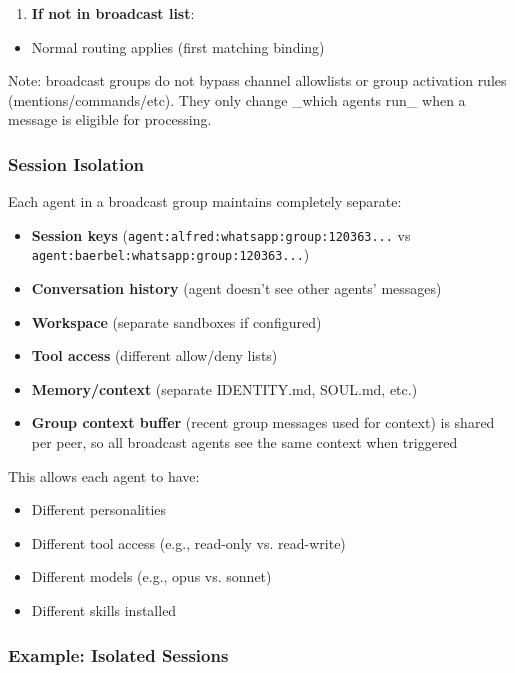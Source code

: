 \begin{enumerate}
  \item \textbf{If not in broadcast list}:
\end{enumerate}

\begin{itemize}
  \item Normal routing applies (first matching binding)
\end{itemize}


Note: broadcast groups do not bypass channel allowlists or group activation rules (mentions/commands/etc). They only change \_which agents run\_ when a message is eligible for processing.

\subsubsection{Session Isolation}


Each agent in a broadcast group maintains completely separate:

\begin{itemize}
  \item \textbf{Session keys} (\texttt{agent:alfred:whatsapp:group:120363...} vs \texttt{agent:baerbel:whatsapp:group:120363...})
  \item \textbf{Conversation history} (agent doesn't see other agents' messages)
  \item \textbf{Workspace} (separate sandboxes if configured)
  \item \textbf{Tool access} (different allow/deny lists)
  \item \textbf{Memory/context} (separate IDENTITY.md, SOUL.md, etc.)
  \item \textbf{Group context buffer} (recent group messages used for context) is shared per peer, so all broadcast agents see the same context when triggered
\end{itemize}


This allows each agent to have:

\begin{itemize}
  \item Different personalities
  \item Different tool access (e.g., read-only vs. read-write)
  \item Different models (e.g., opus vs. sonnet)
  \item Different skills installed
\end{itemize}


\subsubsection{Example: Isolated Sessions}


